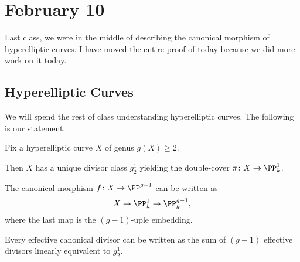 \documentclass[../notes.tex]{subfiles}
\begin{document}
\section{February 10}

Last class, we were in the middle of describing the canonical morphism of hyperelliptic curves. I have moved the entire proof of today because we did more work on it today.

\subsection{Hyperelliptic Curves}
We will spend the rest of class understanding hyperelliptic curves. The following is our statement.
\begin{theorem}
	Fix a hyperelliptic curve $X$ of genus $g(X)\ge2$.
	\begin{listalph}
		\item Then $X$ has a unique divisor class $g^1_2$ yielding the double-cover $\pi\colon X\to\PP^1_k$.
		\item The canonical morphism $f\colon X\to\PP^{g-1}$ can be written as
		\[X\to\PP^1_k\to\PP^{g-1}_k,\]
		where the last map is the $(g-1)$-uple embedding.
		\item Every effective canonical divisor can be written as the sum of $(g-1)$ effective divisors linearly equivalent to $g^1_2$.
	\end{listalph}
\end{theorem}
\end{document}
